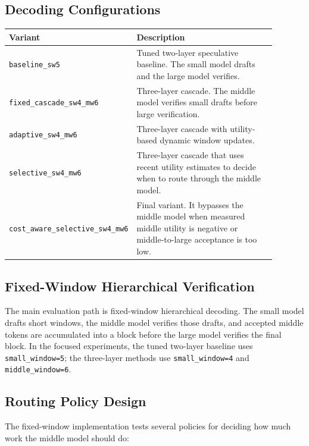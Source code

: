 \documentclass[11pt]{article}
\begin{document}
\subsection{Decoding Configurations}

\begin{center}
\begin{tabular}{p{0.27\linewidth}p{0.62\linewidth}}
\toprule
Variant & Description \\
\midrule
\texttt{baseline\_sw5} & Tuned two-layer speculative baseline. The small model drafts and the large model verifies. \\
\texttt{fixed\_cascade\_sw4\_mw6} & Three-layer cascade. The middle model verifies small drafts before large verification. \\
\texttt{adaptive\_sw4\_mw6} & Three-layer cascade with utility-based dynamic window updates. \\
\texttt{selective\_sw4\_mw6} & Three-layer cascade that uses recent utility estimates to decide when to route through the middle model. \\
\texttt{cost\_aware\_selective\_sw4\_mw6} & Final variant. It bypasses the middle model when measured middle utility is negative or middle-to-large acceptance is too low. \\
\bottomrule
\end{tabular}
\end{center}

\subsection{Fixed-Window Hierarchical Verification}

The main evaluation path is fixed-window hierarchical decoding. The small model drafts short windows, the middle model verifies those drafts, and accepted middle tokens are accumulated into a block before the large model verifies the final block. In the focused experiments, the tuned two-layer baseline uses \texttt{small\_window=5}; the three-layer methods use \texttt{small\_window=4} and \texttt{middle\_window=6}.

\subsection{Routing Policy Design}

The fixed-window implementation tests several policies for deciding how much work the middle model should do:
\end{document}
